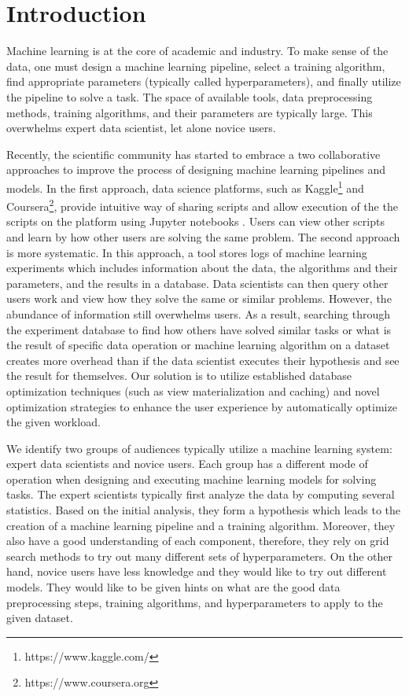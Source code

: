 \section{Introduction} \label{sec-introduction}
Machine learning is at the core of academic and industry.
To make sense of the data, one must design a machine learning pipeline, select a training algorithm, find appropriate parameters (typically called hyperparameters), and finally utilize the pipeline to solve a task.
The space of available tools, data preprocessing methods, training algorithms, and their parameters are typically large.
This overwhelms expert data scientist, let alone novice users.

Recently, the scientific community has started to embrace a two collaborative approaches to improve the process of designing machine learning pipelines and models.
In the first approach, data science platforms, such as Kaggle\footnote{https://www.kaggle.com/} and Coursera\footnote{https://www.coursera.org}, provide intuitive way of sharing scripts and allow execution of the the scripts on the platform using Jupyter notebooks \cite{Kluyver:2016aa}. 
Users can view other scripts and learn by how other users are solving the same problem.
The second approach is more systematic.
In this approach, a tool stores logs of machine learning experiments which includes information about the data, the algorithms and their parameters, and the results in a database.
Data scientists can then query other users work and view how they solve the same or similar problems.
However, the abundance of information still overwhelms users.
As a result, searching through the experiment database to find how others have solved similar tasks or what is the result of specific data operation or machine learning algorithm on a dataset creates more overhead than if the data scientist executes their hypothesis and see the result for themselves.
Our solution is to utilize established database optimization techniques (such as view materialization and caching) and novel optimization strategies to enhance the user experience by automatically optimize the given workload.

We identify two groups of audiences typically utilize a machine learning system: expert data scientists and novice users.
Each group has a different mode of operation when designing and executing machine learning models for solving tasks.
The expert scientists typically first analyze the data by computing several statistics.
Based on the initial analysis, they form a hypothesis which leads to the creation of a machine learning pipeline and a training algorithm.
Moreover, they also have a good understanding of each component, therefore, they rely on grid search methods to try out many different sets of hyperparameters.
On the other hand, novice users have less knowledge and they would like to try out different models.
They would like to be given hints on what are the good data preprocessing steps, training algorithms, and hyperparameters to apply to the given dataset.


